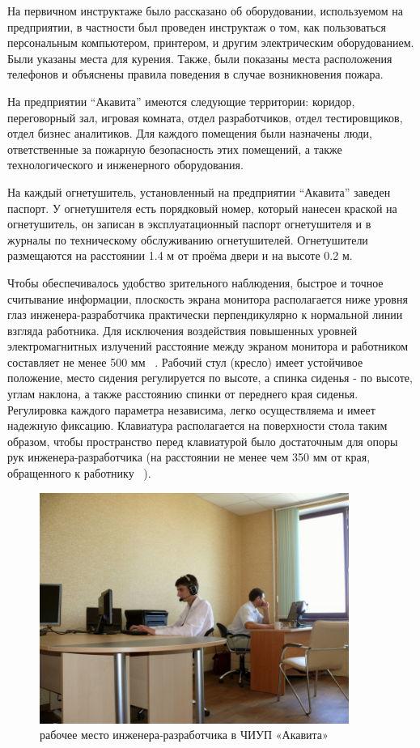 На первичном инструктаже было рассказано об оборудовании, используемом на предприятии, в частности был проведен инструктаж о том, как пользоваться персональным компьютером, принтером, и другим электрическим оборудованием. Были указаны места для курения. Также, были показаны места расположения телефонов и объяснены правила поведения в случае возникновения пожара. 

На предприятии “Акавита” имеются следующие территории: коридор, переговорный зал, игровая комната, отдел разработчиков, отдел тестировщиков, отдел бизнес аналитиков. Для каждого помещения были назначены люди, ответственные за пожарную безопасность этих помещений, а также технологического и инженерного оборудования.

На каждый огнетушитель, установленный на предприятии “Акавита” заведен паспорт. У огнетушителя есть порядковый номер, который нанесен краской на огнетушитель, он записан в эксплуатационный паспорт огнетушителя и в журналы по техническому обслуживанию огнетушителей. Огнетушители размещаются на расстоянии 1.4 м от проёма двери и на высоте 0.2 м.

Чтобы обеспечивалось удобство зрительного наблюдения, быстрое и точное считывание информации, плоскость экрана монитора располагается ниже уровня глаз инженера-разработчика практически перпендикулярно к нормальной линии взгляда работника. Для исключения воздействия повышенных уровней электромагнитных излучений расстояние между экраном монитора и работником составляет не менее 500 мм ~\cite{ot_2}. Рабочий стул (кресло) имеет устойчивое положение, место сидения регулируется по высоте, а спинка сиденья - по высоте, углам наклона, а также расстоянию спинки от переднего края сиденья. Регулировка каждого параметра независима, легко осуществляема и имеет надежную фиксацию. Клавиатура располагается на поверхности стола таким образом, чтобы пространство перед клавиатурой было достаточным для опоры рук инженера-разработчика (на расстоянии не менее чем 350 мм от края, обращенного к работнику ~\cite{ot_2}).

\begin{figure}
  \centering
  \includegraphics[width=0.9\textwidth]{images/work_place.jpg}
  \caption{рабочее место инженера-разработчика в ЧИУП «Акавита»\label{work_place}}
\end{figure}

